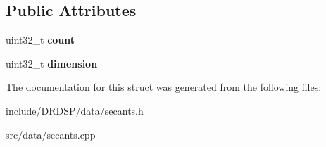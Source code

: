 \subsection*{Public Attributes}
\begin{DoxyCompactItemize}
\item 
\hypertarget{struct_d_r_d_s_p_1_1_secants_a0c6a707afa517ee01f1a2a76e1ed76bf}{uint32\-\_\-t {\bfseries count}}\label{struct_d_r_d_s_p_1_1_secants_a0c6a707afa517ee01f1a2a76e1ed76bf}

\item 
\hypertarget{struct_d_r_d_s_p_1_1_secants_a950d625f7d298f93eaad20062f79db1b}{uint32\-\_\-t {\bfseries dimension}}\label{struct_d_r_d_s_p_1_1_secants_a950d625f7d298f93eaad20062f79db1b}

\end{DoxyCompactItemize}


The documentation for this struct was generated from the following files\-:\begin{DoxyCompactItemize}
\item 
include/\-D\-R\-D\-S\-P/data/secants.\-h\item 
src/data/secants.\-cpp\end{DoxyCompactItemize}
